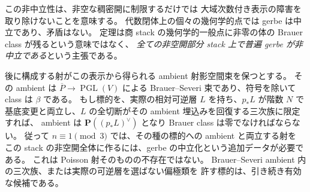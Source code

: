 \begin{remark}[一般点と幾何学的一般点]
この非中立性は、非空な稠密開に制限するだけでは
大域次数付き表示の障害を取り除けないことを意味する。
代数閉体上の個々の幾何学的点では gerbe は中立であり、矛盾はない。
定理は商 stack の幾何学的一般点に非零の体の Brauer class が残るという意味ではなく、
\emph{全ての非空開部分 stack 上で普遍 gerbe が非中立である}という主張である。
\end{remark}

\begin{remark}
後に構成する射がこの表示から得られる ambient 射影空間束を保つとする。
その ambient は $\overline P\to\operatorname{PGL}(V)$ による
Brauer--Severi 束であり、符号を除いて class は $\beta$ である。
もし標的を、実際の相対可逆層 $L$ を持ち、$p_*L$ が階数 $N$ で
基底変更と両立し、$L$ の全切断がその ambient 埋込みを回復する三次族に限定すれば、
ambient は $\mathbf P((p_*L)^\vee)$ となり Brauer class は零でなければならない。
従って $n\equiv1\pmod3$ では、その種の標的への ambient と両立する射を
この stack の非空開全体に作るには、gerbe の中立化という追加データが必要である。
これは Poisson 射そのものの不存在ではない。
Brauer--Severi ambient 内の三次族、または実際の可逆層を選ばない偏極類を
許す標的は、引き続き有効な候補である。
\end{remark}
